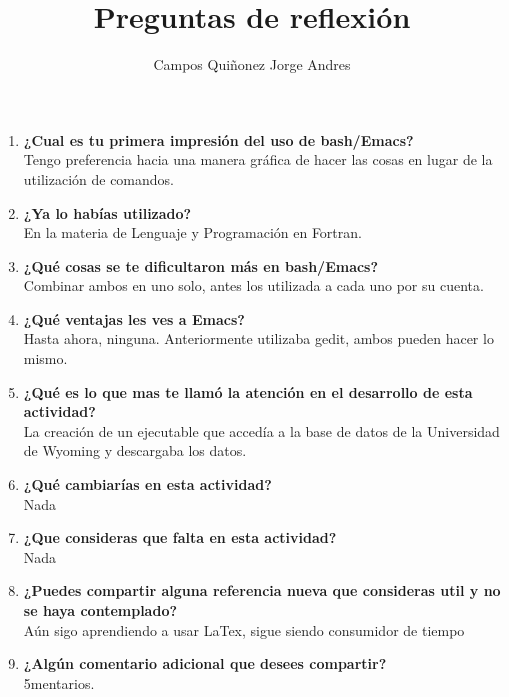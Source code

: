 \documentclass{article}
\begin{document}
\title{Preguntas de reflexión}
\author{Campos Quiñonez Jorge Andres}
\maketitle

\begin{enumerate}
\item \textbf{¿Cual es tu primera impresión del uso de bash/Emacs?}\\
Tengo preferencia hacia una manera gráfica de hacer las cosas en lugar de la utilización de comandos.

\item \textbf{¿Ya lo habías utilizado?}\\
En la materia de Lenguaje y Programación en Fortran.

\item \textbf{¿Qué cosas se te dificultaron más en bash/Emacs?  }\\
Combinar ambos en uno solo, antes los utilizada a cada uno por su cuenta.

\item \textbf{¿Qué ventajas les ves a Emacs?  }\\
Hasta ahora, ninguna. Anteriormente utilizaba gedit, ambos pueden hacer lo mismo.

\item \textbf{¿Qué es lo que mas te llamó la atención en el desarrollo de esta actividad?}\\
La creación de un ejecutable que accedía a la base de datos de la Universidad de Wyoming y descargaba los datos.

\item \textbf{¿Qué cambiarías en esta actividad?}\\
Nada

\item \textbf{¿Que consideras que falta en esta actividad? }\\
Nada

\item \textbf{¿Puedes compartir alguna referencia nueva que consideras util y no se haya contemplado? }\\
Aún sigo aprendiendo a usar LaTex, sigue siendo consumidor de tiempo

\item \textbf{¿Algún comentario adicional que desees compartir? }\\
5mentarios.
\end{enumerate}
\end{document}
